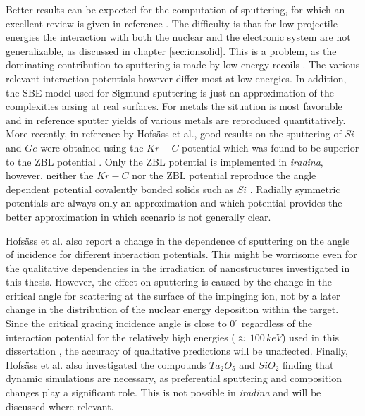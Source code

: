 Better results can be expected for the computation of sputtering, for which an excellent review is given in reference \cite{biersack_computer_1987}. The difficulty is that for low projectile energies the interaction with both the nuclear and the electronic system are not generalizable, as discussed in chapter \ref{sec:ionsolid}. This is a problem, as the dominating contribution to sputtering is made by low energy recoils \cite{thompson_energy_1968}. The various relevant interaction potentials however differ most at low energies. In addition, the SBE model used for Sigmund sputtering is just an approximation of the complexities arsing at real surfaces. For metals the situation is most favorable and in reference \cite{biersack_computer_1987} sputter yields of various metals are reproduced quantitatively. More recently, in reference \cite{hofsass_simulation_2014} by Hofsäss et al., good results on the sputtering of $Si$ and $Ge$ were obtained using the $Kr-C$ \cite{wilson_calculations_1977} potential which was found to be superior to the ZBL potential \cite{ziegler_stopping_1985}. Only the ZBL potential is implemented in \emph{iradina}, however, neither the $Kr-C$ nor the ZBL potential reproduce the angle dependent potential covalently bonded solids such as $Si$ \cite{stillinger_computer_1985,tersoff_new_1988}. Radially symmetric potentials are always only an approximation and which potential provides the better approximation in which scenario is not generally clear.

Hofsäss et al. also report a change in the dependence of sputtering on the angle of incidence for different interaction potentials. This might be worrisome even for the qualitative dependencies in the irradiation of nanostructures investigated in this thesis. However, the effect on sputtering is caused by the change in the critical angle for scattering at the surface of the impinging ion, not by a later change in the distribution of the nuclear energy deposition within the target. Since the critical gracing incidence angle is close to $0^\circ$ regardless of the interaction potential for the relatively high energies ($\approx\,100\,keV$) used in this dissertation \cite{yamamura_empirical_1984}, the accuracy of qualitative predictions will be unaffected. Finally, Hofsäss et al. also investigated the compounds $Ta_2O_5$ and $SiO_2$ finding that dynamic simulations are necessary, as preferential sputtering and composition changes play a significant role. This is not possible in \emph{iradina} and will be discussed where relevant.

